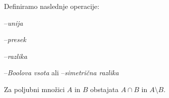 \documentclass[12pt, a4paper]{article}
\begin{document}
\begin{okvir}
\begin{definicija}
Definiramo naslednje operacije:

\begin{description}[align=left, labelwidth=\widthof{$A\setminus B$}+\widthof{$A\oplus B=\set{x\mid x\in A+x\in B}A$}]
\item[\hspace{\widthof{$A\setminus B$}}$A\cup B=\set{x\mid x\in A\lor x\in B}$] --\emph{unija}
\item[\hspace{\widthof{$A\setminus B$}}$A\cap B=\set{x\mid x\in A\land x\in B}$] --\emph{presek}
\item[\hspace{\widthof{$A\cup B$}}$A\setminus B=\set{x\mid x\in A\land x\not\in B}$] --\emph{razlika}
\item[\hspace{\widthof{$A\setminus B$}+\widthof{$A\cup B$}-\widthof{$A\oplus B$}}$A\oplus B=\set{x\mid x\in A+x\in B}$] --\emph{Boolova vsota} ali --\emph{simetrična razlika}
\end{description}
\end{definicija}
\end{okvir}

\begin{trditev}
Za poljubni množici $A$ in $B$ obstajata $A\cap B$ in $A\setminus B$.
\end{trditev}

\obvs
\end{document}
